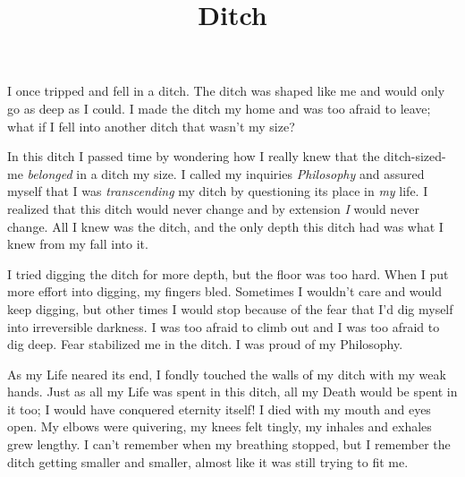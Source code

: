 \documentclass{article}
\title{Ditch}
\begin{document}
 \newline

I once tripped and fell in a ditch. The ditch was shaped like me and
would only go as deep as I could. I made the ditch my home and was too
afraid to leave; what if I fell into another ditch that wasn't my size?
\newline
\newline


In this ditch I passed time by wondering how I really knew that the
ditch-sized-me \textit{belonged} in a ditch my size. I called my
inquiries \textit{Philosophy} and assured myself that I was
\textit{transcending} my ditch by questioning its place in \textit{my}
life. I realized that this ditch would never change and by extension
\textit{I} would never change. All I knew was the ditch, and the only
depth this ditch had was what I knew from my fall into it. 
\newline
\newline


I tried digging the ditch for more depth, but the floor was too hard.
When I put more effort into digging, my fingers bled. Sometimes
I wouldn't care and would keep digging, but other times I would stop
because of the fear that I'd dig myself into irreversible darkness.
I was too afraid to climb out and I was too afraid to dig deep. Fear
stabilized me in the ditch. I was proud of my Philosophy. \newline
\newline


As my Life neared its end, I fondly touched the walls of my ditch with
my weak hands. Just as all my Life was spent in this ditch, all my Death
would be spent in it too; I would have conquered eternity itself! I died
with my mouth and eyes open. My elbows were quivering, my knees felt
tingly, my inhales and exhales grew lengthy. I can't remember when my
breathing stopped, but I remember the ditch getting smaller and smaller,
almost like it was still trying to fit me. \newline
\end{document}
